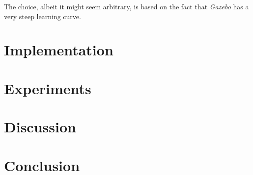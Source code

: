 \documentclass[titlepage]{article}
\begin{document}
The choice, albeit it might seem arbitrary, is based on the fact that \textit{Gazebo} has a very steep learning curve.


\section{Implementation}


\section{Experiments}


\section{Discussion}


\section{Conclusion}




\end{document}
